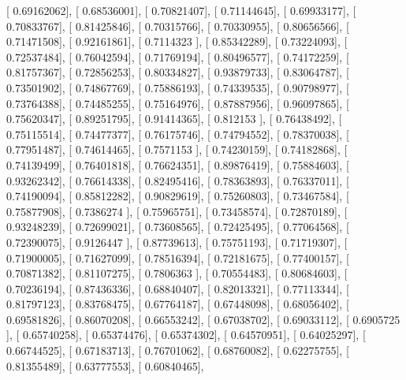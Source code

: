 \documentclass{article}
\begin{document}
       [ 0.69162062],
       [ 0.68536001],
       [ 0.70821407],
       [ 0.71144645],
       [ 0.69933177],
       [ 0.70833767],
       [ 0.81425846],
       [ 0.70315766],
       [ 0.70330955],
       [ 0.80656566],
       [ 0.71471508],
       [ 0.92161861],
       [ 0.7114323 ],
       [ 0.85342289],
       [ 0.73224093],
       [ 0.72537484],
       [ 0.76042594],
       [ 0.71769194],
       [ 0.80496577],
       [ 0.74172259],
       [ 0.81757367],
       [ 0.72856253],
       [ 0.80334827],
       [ 0.93879733],
       [ 0.83064787],
       [ 0.73501902],
       [ 0.74867769],
       [ 0.75886193],
       [ 0.74339535],
       [ 0.90798977],
       [ 0.73764388],
       [ 0.74485255],
       [ 0.75164976],
       [ 0.87887956],
       [ 0.96097865],
       [ 0.75620347],
       [ 0.89251795],
       [ 0.91414365],
       [ 0.812153  ],
       [ 0.76438492],
       [ 0.75115514],
       [ 0.74477377],
       [ 0.76175746],
       [ 0.74794552],
       [ 0.78370038],
       [ 0.77951487],
       [ 0.74614465],
       [ 0.7571153 ],
       [ 0.74230159],
       [ 0.74182868],
       [ 0.74139499],
       [ 0.76401818],
       [ 0.76624351],
       [ 0.89876419],
       [ 0.75884603],
       [ 0.93262342],
       [ 0.76614338],
       [ 0.82495416],
       [ 0.78363893],
       [ 0.76337011],
       [ 0.74190094],
       [ 0.85812282],
       [ 0.90829619],
       [ 0.75260803],
       [ 0.73467584],
       [ 0.75877908],
       [ 0.7386274 ],
       [ 0.75965751],
       [ 0.73458574],
       [ 0.72870189],
       [ 0.93248239],
       [ 0.72699021],
       [ 0.73608565],
       [ 0.72425495],
       [ 0.77064568],
       [ 0.72390075],
       [ 0.9126447 ],
       [ 0.87739613],
       [ 0.75751193],
       [ 0.71719307],
       [ 0.71900005],
       [ 0.71627099],
       [ 0.78516394],
       [ 0.72181675],
       [ 0.77400157],
       [ 0.70871382],
       [ 0.81107275],
       [ 0.7806363 ],
       [ 0.70554483],
       [ 0.80684603],
       [ 0.70236194],
       [ 0.87436336],
       [ 0.68840407],
       [ 0.82013321],
       [ 0.77113344],
       [ 0.81797123],
       [ 0.83768475],
       [ 0.67764187],
       [ 0.67448098],
       [ 0.68056402],
       [ 0.69581826],
       [ 0.86070208],
       [ 0.66553242],
       [ 0.67038702],
       [ 0.69033112],
       [ 0.6905725 ],
       [ 0.65740258],
       [ 0.65374476],
       [ 0.65374302],
       [ 0.64570951],
       [ 0.64025297],
       [ 0.66744525],
       [ 0.67183713],
       [ 0.76701062],
       [ 0.68760082],
       [ 0.62275755],
       [ 0.81355489],
       [ 0.63777553],
       [ 0.60840465],
\end{document}
